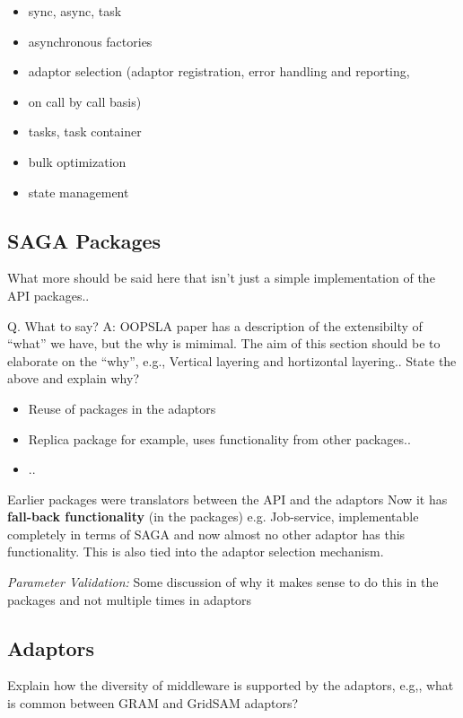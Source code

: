 \documentclass[10pt,letterpaper]{article}
\begin{document}
\begin{itemize}
	\item sync, async, task
	\item asynchronous factories
	\item adaptor selection (adaptor registration, error handling and reporting,
	\item on call by call basis)
	\item tasks, task container
	\item bulk optimization
	\item state management
\end{itemize}

\subsection{SAGA Packages}

What more should be said here that isn't just a simple implementation
of the API packages.. 

Q. What to say?  A: OOPSLA paper has a description of the extensibilty
of ``what'' we have, but the why is mimimal. The aim of this section
should be to elaborate on the ``why'', e.g., Vertical layering and
hortizontal layering..  State the above and explain why?

\begin{itemize}
\item Reuse of packages in the adaptors
\item Replica package for example, uses functionality from other packages..
\item ..
\end{itemize}

Earlier packages were translators between the API and the adaptors Now
it has {\bf fall-back functionality} (in the packages)
e.g. Job-service, implementable completely in terms of SAGA and now
almost no other adaptor has this functionality.  This is also tied
into the adaptor selection mechanism.

{\it Parameter Validation:} Some discussion of why it makes
sense to do this in the packages and not multiple times in adaptors

\subsection{Adaptors}

Explain how the diversity of middleware is supported by the adaptors,
e.g,, what is common between GRAM and GridSAM adaptors?
\end{document}
